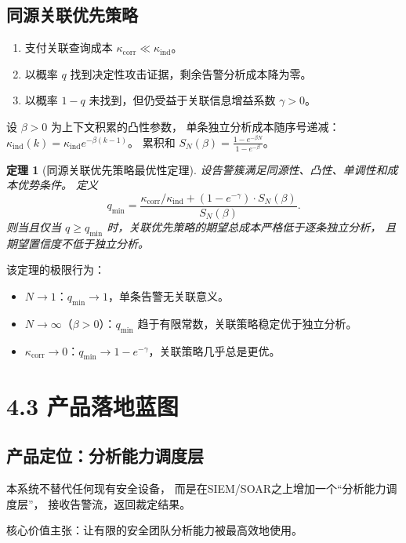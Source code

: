 \documentclass[11pt,a4paper]{article}
\newtheorem{theorem}{定理}[section]
\begin{document}
\subsection{同源关联优先策略}

\begin{enumerate}
    \item 支付关联查询成本 $\kappa_{\text{corr}} \ll \kappa_{\text{ind}}$。
    \item 以概率 $q$ 找到决定性攻击证据，剩余告警分析成本降为零。
    \item 以概率 $1-q$ 未找到，但仍受益于关联信息增益系数 $\gamma > 0$。
\end{enumerate}

设 $\beta > 0$ 为上下文积累的凸性参数，
单条独立分析成本随序号递减：$\kappa_{\text{ind}}(k) = \kappa_{\text{ind}} e^{-\beta(k-1)}$。
累积和 $S_N(\beta) = \frac{1 - e^{-\beta N}}{1 - e^{-\beta}}$。

\begin{theorem}[同源关联优先策略最优性定理]
设告警簇满足同源性、凸性、单调性和成本优势条件。
定义
\[
q_{\min} = \frac{\kappa_{\text{corr}} / \kappa_{\text{ind}} + (1 - e^{-\gamma}) \cdot S_N(\beta)}{S_N(\beta)}.
\]
则当且仅当 $q \ge q_{\min}$ 时，关联优先策略的期望总成本严格低于逐条独立分析，
且期望置信度不低于独立分析。
\end{theorem}

该定理的极限行为：
\begin{itemize}
    \item $N \to 1$：$q_{\min} \to 1$，单条告警无关联意义。
    \item $N \to \infty$（$\beta > 0$）：$q_{\min}$ 趋于有限常数，关联策略稳定优于独立分析。
    \item $\kappa_{\text{corr}} \to 0$：$q_{\min} \to 1 - e^{-\gamma}$，关联策略几乎总是更优。
\end{itemize}

\section{4.3 产品落地蓝图}

\subsection{产品定位：分析能力调度层}

本系统不替代任何现有安全设备，
而是在SIEM/SOAR之上增加一个“分析能力调度层”，
接收告警流，返回裁定结果。

核心价值主张：让有限的安全团队分析能力被最高效地使用。
\end{document}
